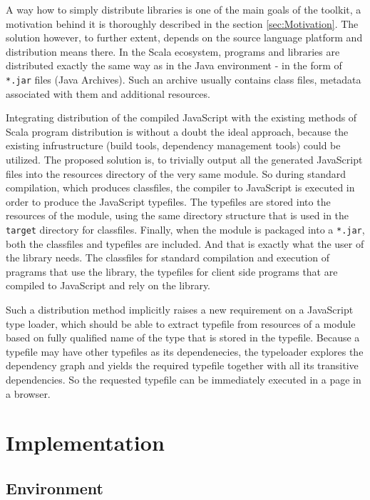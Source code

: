 \documentclass[12pt,a4paper]{report}
\begin{document}
A way how to simply distribute libraries is one of the main goals of the toolkit, a motivation behind it is thoroughly described in the section \ref{sec:Motivation}. The solution however, to further extent, depends on the source language platform and distribution means there. In the Scala ecosystem, programs and libraries are distributed exactly the same way as in the Java environment - in the form of \texttt{*.jar} files (Java Archives). Such an archive usually contains class files, metadata associated with them and additional resources.

Integrating distribution of the compiled JavaScript with the existing methods of Scala program distribution is without a doubt the ideal approach, because the existing infrustructure (build tools, dependency management tools) could be utilized. The proposed solution is, to trivially output all the generated JavaScript files into the resources directory of the very same module. So during standard compilation, which produces classfiles, the compiler to JavaScript is executed in order to produce the JavaScript typefiles. The typefiles are stored into the resources of the module, using the same directory structure that is used in the \texttt{target} directory for classfiles. Finally, when the module is packaged into a \texttt{*.jar}, both the classfiles and typefiles are included. And that is exactly what the user of the library needs. The classfiles for standard compilation and execution of pragrams that use the library, the typefiles for client side programs that are compiled to JavaScript and rely on the library.

Such a distribution method implicitly raises a new requirement on a JavaScript type loader, which should be able to extract typefile from resources of a module based on fully qualified name of the type that is stored in the typefile. Because a typefile may have other typefiles as its dependenecies, the typeloader explores the dependency graph and yields the required typefile together with all its transitive dependencies. So the requested typefile can be immediately executed in a page in a browser.



\chapter{Implementation}

\section{Environment}
\end{document}

